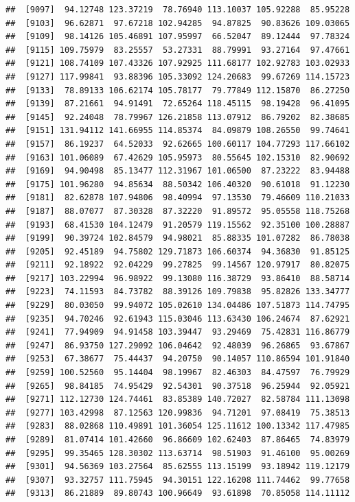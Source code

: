 \documentclass[
]{article}
\begin{document}
\begin{verbatim}
##  [9097]  94.12748 123.37219  78.76940 113.10037 105.92288  85.95228
##  [9103]  96.62871  97.67218 102.94285  94.87825  90.83626 109.03065
##  [9109]  98.14126 105.46891 107.95997  66.52047  89.12444  97.78324
##  [9115] 109.75979  83.25557  53.27331  88.79991  93.27164  97.47661
##  [9121] 108.74109 107.43326 107.92925 111.68177 102.92783 103.02933
##  [9127] 117.99841  93.88396 105.33092 124.20683  99.67269 114.15723
##  [9133]  78.89133 106.62174 105.78177  79.77849 112.15870  86.27250
##  [9139]  87.21661  94.91491  72.65264 118.45115  98.19428  96.41095
##  [9145]  92.24048  78.79967 126.21858 113.07912  86.79202  82.38685
##  [9151] 131.94112 141.66955 114.85374  84.09879 108.26550  99.74641
##  [9157]  86.19237  64.52033  92.62665 100.60117 104.77293 117.66102
##  [9163] 101.06089  67.42629 105.95973  80.55645 102.15310  82.90692
##  [9169]  94.90498  85.13477 112.31967 101.06500  87.23222  83.94488
##  [9175] 101.96280  94.85634  88.50342 106.40320  90.61018  91.12230
##  [9181]  82.62878 107.94806  98.40994  97.13530  79.46609 110.21033
##  [9187]  88.07077  87.30328  87.32220  91.89572  95.05558 118.75268
##  [9193]  68.41530 104.12479  91.20579 119.15562  92.35100 100.28887
##  [9199]  90.39724 102.84579  94.98021  85.88335 101.07282  86.78038
##  [9205]  92.45189  94.75802 129.71873 106.60374  94.36830  91.85125
##  [9211]  92.18922  92.04229  99.27825  99.14567 120.97917  80.82075
##  [9217] 103.22994  96.98922  99.13080 116.38729  93.86410  88.58714
##  [9223]  74.11593  84.73782  88.39126 109.79838  95.82826 133.34777
##  [9229]  80.03050  99.94072 105.02610 134.04486 107.51873 114.74795
##  [9235]  94.70246  92.61943 115.03046 113.63430 106.24674  87.62921
##  [9241]  77.94909  94.91458 103.39447  93.29469  75.42831 116.86779
##  [9247]  86.93750 127.29092 106.04642  92.48039  96.26865  93.67867
##  [9253]  67.38677  75.44437  94.20750  90.14057 110.86594 101.91840
##  [9259] 100.52560  95.14404  98.19967  82.46303  84.47597  76.79929
##  [9265]  98.84185  74.95429  92.54301  90.37518  96.25944  92.05921
##  [9271] 112.12730 124.74461  83.85389 140.72027  82.58784 111.13098
##  [9277] 103.42998  87.12563 120.99836  94.71201  97.08419  75.38513
##  [9283]  88.02868 110.49891 101.36054 125.11612 100.13342 117.47985
##  [9289]  81.07414 101.42660  96.86609 102.62403  87.86465  74.83979
##  [9295]  99.35465 128.30302 113.63714  98.51903  91.46100  95.00269
##  [9301]  94.56369 103.27564  85.62555 113.15199  93.18942 119.12179
##  [9307]  93.32757 111.75945  94.30151 122.16208 111.74462  99.77658
##  [9313]  86.21889  89.80743 100.96649  93.61898  70.85058 114.11112

\end{verbatim}
\end{document}
